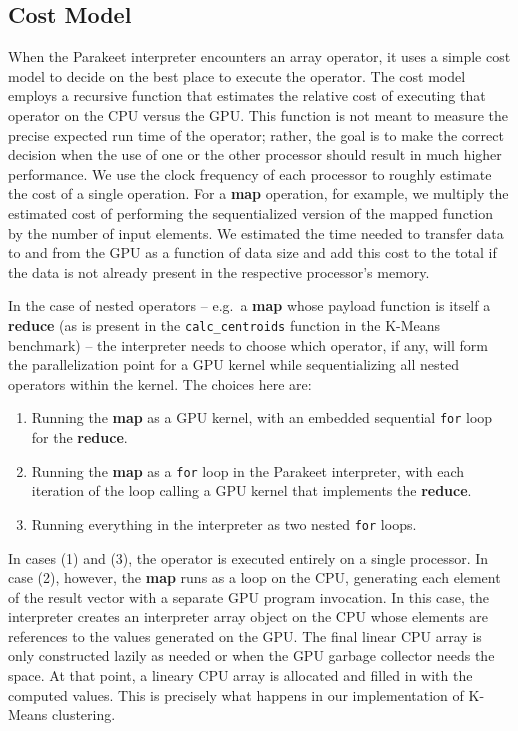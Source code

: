 \documentclass[preprint]{sigplanconf}
\begin{document}
\subsection{Cost Model}
\label{costmodel}

When the Parakeet interpreter encounters an array operator, it uses a simple cost model to decide on the best place to execute the operator.  The cost model employs a recursive function that estimates the relative cost of executing that operator on the CPU versus the GPU.  This function is not meant to measure the precise expected run time of the operator; rather, the goal is to make the correct decision when the use of one or the other processor should result in much higher performance.  We use the clock frequency of each processor to roughly estimate the cost of a single operation.  For a \textbf{map} operation, for example, we multiply the estimated cost of performing the sequentialized version of the mapped function by the number of input elements. We estimated the time needed to transfer data to and from the GPU as a function of data size and add this cost to the total if the data is not already present in the respective processor's memory.

In the case of nested operators -- e.g.~a \textbf{map} whose payload function is itself a \textbf{reduce} (as is present in the \texttt{calc\_centroids} function in the K-Means benchmark) -- the interpreter needs to choose which operator, if any, will form the parallelization point for a GPU kernel while sequentializing all nested operators within the kernel.  The choices here are:

\begin{enumerate}
\item Running the \textbf{map} as a GPU kernel, with an embedded sequential \texttt{for} loop for the \textbf{reduce}.
\item Running the \textbf{map} as a \texttt{for} loop in the Parakeet interpreter, with each iteration of the loop calling a GPU kernel that implements the \textbf{reduce}.
\item Running everything in the interpreter as two nested \texttt{for} loops.
\end{enumerate}

In cases (1) and (3), the operator is executed entirely on a single processor.  In case (2), however, the \textbf{map} runs as a loop on the CPU, generating each element of the result vector with a separate GPU program invocation.  In this case, the interpreter creates an interpreter array object on the CPU whose elements are references to the values generated on the GPU.  The final linear CPU array is only constructed lazily as needed or when the GPU garbage collector needs the space.  At that point, a lineary CPU array is allocated and filled in with the computed values.  This is precisely what happens in our implementation of K-Means clustering.
\end{document}
